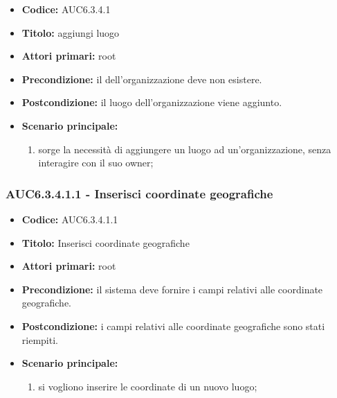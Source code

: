 \documentclass[casi-duso]{subfiles}
\begin{document}
\begin{itemize}
  \item \textbf{Codice:} AUC6.3.4.1
  \item \textbf{Titolo:} aggiungi luogo
  \item \textbf{Attori primari:} root
  \item \textbf{Precondizione:} il  dell'organizzazione deve non esistere.
  \item \textbf{Postcondizione:} il luogo dell'organizzazione viene aggiunto.
  \item \textbf{Scenario principale:}
  \begin{enumerate}
    \item sorge la necessità di aggiungere un luogo ad un'organizzazione, senza interagire con il suo owner;
  \end{enumerate}
\end{itemize}

\subsubsection{AUC6.3.4.1.1 - Inserisci coordinate geografiche}%
\label{subsub:AUC6.3.4.1.1}
\begin{itemize}
  \item \textbf{Codice:} AUC6.3.4.1.1
  \item \textbf{Titolo:} Inserisci coordinate geografiche
  \item \textbf{Attori primari:} root
  \item \textbf{Precondizione:} il sistema deve fornire i campi relativi alle coordinate geografiche.
  \item \textbf{Postcondizione:} i campi relativi alle coordinate geografiche sono stati riempiti.
  \item \textbf{Scenario principale:}
  \begin{enumerate}
    \item si vogliono inserire le coordinate di un nuovo luogo;
  \end{enumerate}
\end{itemize}
\end{document}
